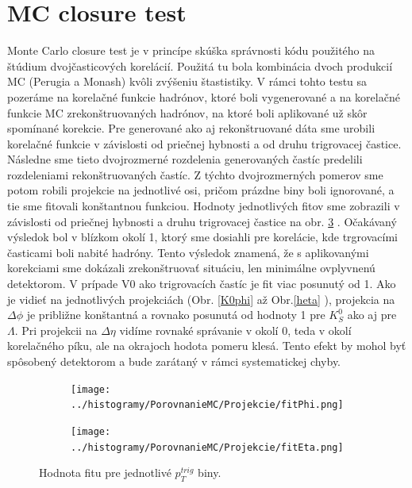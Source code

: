 \documentclass[thesismargins, thesislinespacing]{rnthesis}
\begin{document}
\section{MC closure test}

Monte Carlo closure test je v princípe skúška správnosti kódu použitého na štúdium dvojčasticových korelácií. Použitá tu bola kombinácia dvoch produkcií MC (Perugia a Monash) kvôli zvýšeniu štastistiky. V rámci tohto testu sa pozeráme na korelačné funkcie hadrónov, ktoré boli vygenerované a na korelačné funkcie MC zrekonštruovaných hadrónov, na ktoré boli aplikované už skôr spomínané korekcie. Pre generované ako aj rekonštruované dáta sme urobili korelačné funkcie v závislosti od priečnej hybnosti  a od druhu trigrovacej častice. Následne sme tieto dvojrozmerné rozdelenia generovaných častíc predelili rozdeleniami rekonštruovaných častíc. Z týchto dvojrozmerných pomerov sme potom robili projekcie na jednotlivé osi, pričom prázdne biny boli ignorované, a tie sme fitovali konštantnou funkciou. Hodnoty jednotlivých fitov sme zobrazili v závislosti od priečnej hybnosti a druhu trigrovacej častice na obr. \ref{fitMC} . Očakávaný výsledok bol v blízkom okolí 1, ktorý sme dosiahli pre korelácie, kde trgrovacími časticami boli nabité hadróny. Tento výsledok znamená, že s aplikovanými korekciami sme dokázali zrekonštruovať situáciu, len minimálne ovplyvnenú detektorom.
V prípade V0 ako trigrovacích častíc je fit viac posunutý od 1. Ako je vidieť na jednotlivých projekciách (Obr. \ref{K0phi}  až Obr.\ref{heta}  ), projekcia na $\Delta \phi$ je približne konštantná a rovnako posunutá od hodnoty 1 pre $K^0_S$ ako aj pre $\Lambda$. Pri projekcii na $\Delta \eta$ vidíme rovnaké správanie v okolí 0, teda v okolí korelačného píku, ale na okrajoch hodota pomeru klesá. Tento efekt by mohol byť spôsobený detektorom a bude zarátaný v rámci systematickej chyby. 

\begin{figure}
	\centering
	\begin{subfigure}{0.5\textwidth}
		\centering
		\texttt{[image: ../histogramy/PorovnanieMC/Projekcie/fitPhi.png]}
		\caption{}
		\label{fitPhi}
	\end{subfigure}%
	\begin{subfigure}{0.5\textwidth}
		\centering
		\texttt{[image: ../histogramy/PorovnanieMC/Projekcie/fitEta.png]}
		\caption{}
		\label{fitEta}
	\end{subfigure}
	\caption{Hodnota fitu pre jednotlivé $p_{T}^{trig}$ biny.}
	\label{fitMC}
\end{figure}
\end{document}
